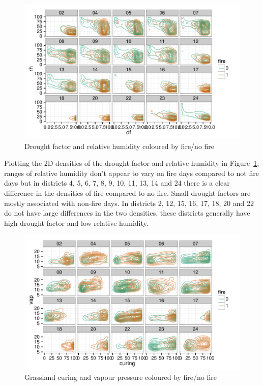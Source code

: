 \documentclass[11pt,a4paper]{article}
\begin{document}
\begin{figure}
  \centering
	\includegraphics[width=1\columnwidth]{figures/dh_fire.pdf}
  \caption{Drought factor and relative humidity coloured by fire/no fire}
  \label{fig:dh_fire}
\end{figure}

Plotting the 2D densities of the drought factor and relative humidity in Figure~\ref{fig:dh_fire}, ranges of relative humidity don't appear to vary on fire days compared to not fire days but in districts 4, 5, 6, 7, 8, 9, 10, 11, 13, 14 and 24 there is a clear difference in the densities of fire compared to no fire. Small drought factors are mostly associated with non-fire days. In districts 2, 12, 15, 16, 17, 18, 20 and 22 do not have large differences in the two densities, these districts generally have high drought factor and low relative humidity.

\begin{figure}
  \centering
	\includegraphics[width=1\columnwidth]{figures/gv_fire.pdf}
  \caption{Grassland curing and vapour pressure coloured by fire/no fire}
  \label{fig:gv_fire}
\end{figure}
\end{document}
